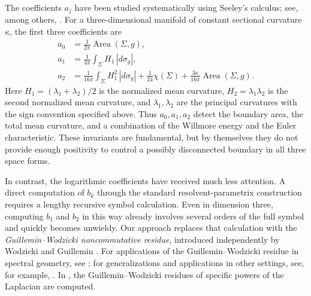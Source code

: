 \documentclass[11pt]{amsart}
\newcommand{\Area}{\operatorname{Area}}
\theoremstyle{definition}
\numberwithin{equation}{section}
\begin{document}
	The   coefficients $a_j$ have been studied systematically using Seeley's calculus; see, among others, \cite{seeleyComplexPowersElliptic1967,polterovichHeatInvariantsSteklov2015,liuAsymptoticExpansionTrace2015,wangRelativeHeatInvariants2019}.  For a three-dimensional manifold of constant sectional curvature $\kappa$, the first three coefficients are 
	\begin{align}
		\label{eq: a0}
		a_0
		&=\frac{1}{2\pi}\Area(\Sigma,g),\\
		\label{eq: a1}
		a_1
		&=\frac{1}{4\pi}\int_\Sigma H_1\,|d\sigma_g|,\\
		\label{eq: a2}
		a_2
		&=\frac{1}{16\pi}\int_\Sigma H_1^2\,|d\sigma_g|
		+\frac{1}{24}\chi(\Sigma)
		+\frac{3\kappa}{16\pi}\Area(\Sigma,g).
	\end{align}
	Here $H_1=(\lambda_1+\lambda_2)/2$ is the normalized mean curvature, $H_2=\lambda_1\lambda_2$ is the second normalized mean curvature, and $\lambda_1,\lambda_2$ are the principal curvatures with the sign convention specified above.  Thus $a_0,a_1,a_2$ detect the boundary area, the total mean curvature, and a combination of the Willmore energy and the Euler characteristic.  These invariants are fundamental, but by themselves they do not provide enough positivity to control a possibly disconnected boundary in all three space forms.
	
	In contrast, the logarithmic coefficients have received much less attention.  A direct computation of $b_k$ through the standard resolvent-parametrix construction requires a lengthy recursive symbol calculation.  Even in dimension three,  computing $b_1$ and $b_2$ in this way already involves several orders of the full symbol and quickly becomes unwieldy.  Our approach replaces
	that calculation with the \emph{Guillemin--Wodzicki noncommutative residue},
	introduced independently by Wodzicki and Guillemin
	\cite{wodzickiLocalInvariantsSpectral1984,guilleminNewProofWeyl1985}. For applications of the Guillemin--Wodzicki residue in spectral geometry, see  \cite{guilleminNewProofWeyl1985,zelditchLecturesWaveInvariants1999}; for generalizations and applications in other settings, see, for example, \cite{connesLocalIndexFormula1995,guilleminResidueTracesCertain1993,fedosovNoncommutativeResidueManifolds1996,pongeNoncommutativeResidueHeisenberg2007}. In \cite{dabrowskiSpectralMetricEinstein2023}, the Guillemin--Wodzicki residues of specific powers of the Laplacian are computed.
	
	
	
\end{document}

